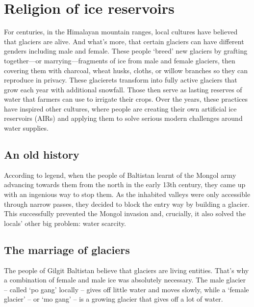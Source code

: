 \chapter{Religion of ice reservoirs}


For centuries, in the Himalayan mountain ranges, local cultures have believed that glaciers are alive. And
what’s more, that certain glaciers can have different genders including male and female. These people ‘breed’
new glaciers by grafting together—or marrying—fragments of ice from male and female glaciers, then covering them
with charcoal, wheat husks, cloths, or willow branches so they can reproduce in privacy. These glacierets
transform into fully active glaciers that grow each year with additional snowfall. Those then serve as lasting
reserves of water that farmers can use to irrigate their crops. Over the years, these practices have inspired
other cultures, where people are creating their own artificial ice reservoirs (AIRs) and applying them to solve
serious modern challenges around water supplies.

\section{An old history}

According to legend, when the people of Baltistan learnt of the Mongol army advancing towards
them from the north in the early 13th century, they came up with an ingenious way to stop them. As the inhabited
valleys were only accessible through narrow passes, they decided to block the entry way by building a glacier.
This successfully prevented the Mongol invasion and, crucially, it also solved the locals’ other big problem:
water scarcity.

\section{The marriage of glaciers}

The people of Gilgit Baltistan believe that glaciers are living entities. That’s why a combination of female and
male ice was absolutely necessary. The male glacier – called ‘po gang’ locally – gives off little water and
moves slowly, while a ‘female glacier’ – or ‘mo gang’ – is a growing glacier that gives off a lot of water.

